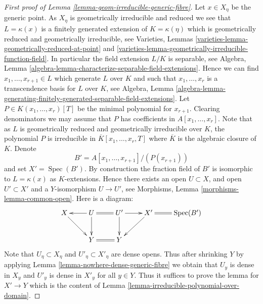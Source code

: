 \documentclass[10pt,a4paper]{amsart}
\theoremstyle{plain}
\theoremstyle{definition}
\theoremstyle{remark}
\numberwithin{equation}{subsection}
\def\Spec{\mathop{\mathrm{Spec}}}
\begin{document}
\begin{proof}[First proof of Lemma \ref{lemma-geom-irreducible-generic-fibre}]
\medskip\noindent
Let $x \in X_\eta$ be the generic point. As $X_\eta$ is geometrically
irreducible and reduced we see that $L = \kappa(x)$ is a finitely generated
extension of $K = \kappa(\eta)$ which is geometrically reduced and
geometrically irreducible, see
Varieties, Lemmas \ref{varieties-lemma-geometrically-reduced-at-point} and
\ref{varieties-lemma-geometrically-irreducible-function-field}.
In particular the field extension $L/K$ is separable, see
Algebra, Lemma \ref{algebra-lemma-characterize-separable-field-extensions}.
Hence we can find $x_1, \ldots, x_{r + 1} \in L$ which generate $L$
over $K$ and such that $x_1, \ldots, x_r$ is a transcendence basis for
$L$ over $K$, see
Algebra, Lemma
\ref{algebra-lemma-generating-finitely-generated-separable-field-extensions}.
Let $P \in K(x_1, \ldots, x_r)[T]$ be the minimal polynomial for
$x_{r + 1}$. Clearing denominators we may assume that
$P$ has coefficients in $A[x_1, \ldots, x_r]$.
Note that as $L$ is geometrically reduced and geometrically irreducible
over $K$, the polynomial $P$ is irreducible in
$\overline{K}[x_1, \ldots, x_r, T]$ where $\overline{K}$ is the
algebraic closure of $K$. Denote
$$
B' = A[x_1, \ldots, x_{r + 1}]/(P(x_{r + 1}))
$$
and set $X' = \Spec(B')$. By construction the fraction field of $B'$
is isomorphic to $L = \kappa(x)$ as $K$-extensions. Hence there exists an
open $U \subset X$, and open $U' \subset X'$ and a $Y$-isomorphism
$U \to U'$, see
Morphisms, Lemma \ref{morphisms-lemma-common-open}.
Here is a diagram:
$$
\xymatrix{
X \ar[rd] &
U \ar[l] \ar@{=}[r] \ar[d] &
U' \ar[r] \ar[d] &
X' \ar[ld] \ar@{=}[r] & \Spec(B') \\
& Y \ar@{=}[r] & Y &
}
$$
Note that $U_\eta \subset X_\eta$ and $U'_\eta \subset X'_\eta$ are
dense opens. Thus after shrinking $Y$ by applying
Lemma \ref{lemma-nowhere-dense-generic-fibre}
we obtain that $U_y$ is dense in $X_y$ and $U'_y$ is dense in $X'_y$
for all $y \in Y$. Thus it suffices to prove the lemma for
$X' \to Y$ which is the content of
Lemma \ref{lemma-irreducible-polynomial-over-domain}.
\end{proof}
\end{document}
